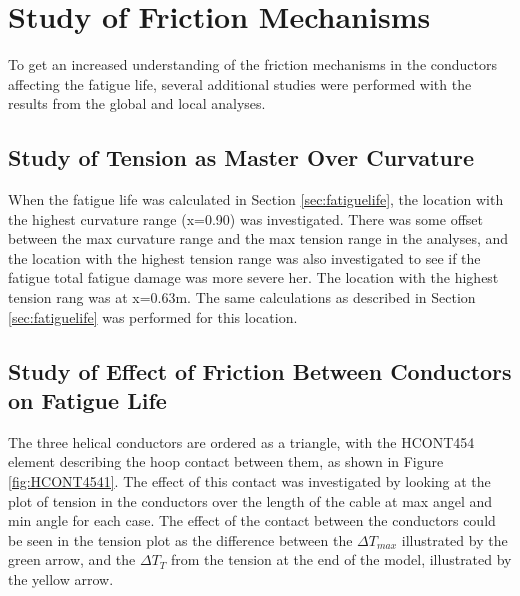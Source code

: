 \section{Study of Friction Mechanisms}
To get an increased understanding of the friction mechanisms in the conductors affecting the fatigue life, several additional studies were performed with the results from the global and local analyses.
\subsection{Study of Tension as Master Over Curvature}
When the fatigue life was calculated in Section \ref{sec:fatiguelife}, the location with the highest curvature range (x=0.90) was investigated. There was some offset between the max curvature range and the max tension range in the analyses, and  the location with the highest tension range was also investigated to see if the fatigue total fatigue damage was more severe her. The location with the highest tension rang was at x=0.63m. The same calculations as described in Section \ref{sec:fatiguelife} was performed for this location.  
\subsection{Study of Effect of Friction Between Conductors on Fatigue Life}
The three helical conductors are ordered as a triangle, with the HCONT454 element describing the hoop contact between them, as shown in Figure \ref{fig:HCONT4541}. The effect of this contact was investigated by looking at the plot of tension in the conductors over the length of the cable at max angel and min angle for each case. The effect of the contact between the conductors could be seen in the tension plot as the difference between the $\Delta T_{max}$ illustrated by the green arrow, and the $\Delta T_T$ from the tension at the end of the model, illustrated by the yellow arrow. 

